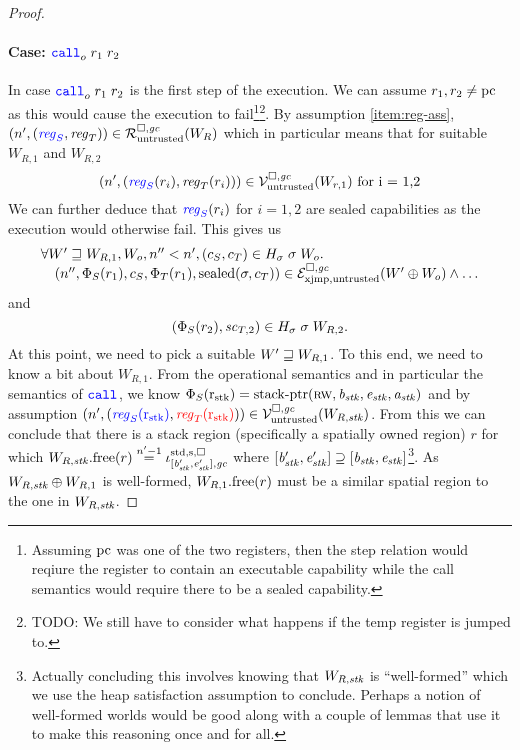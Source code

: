 \documentclass[a4paper]{article}
\begin{document}
\begin{proof}
\paragraph{Case: $\scall[o]{}{r_1}{r_2}$}
In case $\scall[o]{}{r_1}{r_2}$ is the first step of the execution. We can assume $r_1,r_2 \neq \pcreg$ as this would cause the execution to fail\footnote{Assuming $\pcreg$ was one of the two registers, then the step relation would reqiure the register to contain an executable capability while the call semantics would require there to be a sealed capability.}\footnote{{\color{red} TODO:} We still have to consider what happens if the temp register is jumped to.}. By assumption \ref{item:reg-ass}, $\npair[n']{\stpair{\reg}{\reg}} \in \lrr(W_R)$ which in particular means that for suitable $W_{R,1}$ and $W_{R,2}$
\[
  \npair[n']{(\src{\reg_S}(r_i),\reg_T(r_i))} \in \lrv(W_{r,1}) \text{ for i = 1,2}
\]
We can further deduce that $\src{\reg_S}(r_i)$ for $i=1,2$ are sealed capabilities as the execution would otherwise fail. This gives us
\[
  \begin{array}{l}
    \forall W' \future W_{R,1}, W_o, n'' < n', (c_S,c_T) \in H_\sigma \; \sigma \; W_o \ldotp \\
    \quad \npair[n'']{\Phi_S(r_1),c_S,\Phi_T(r_1),\sealed{\sigma,c_T}} \in \lrexj(W' \oplus W_o) \wedge \dots
  \end{array}
\]
and
\[
  (\Phi_S(r_2), \vsc_{T,2}) \in H_\sigma \; \sigma \; W_{R,2}.
\]
At this point, we need to pick a suitable $W' \future W_{R,1}$. To this end, we need to know a bit about $W_{R,1}$. From the operational semantics and in particular the semantics of $\scall{}{}{}{}$, we know $\Phi_S(\rstk) = \stkptr{\rw,\baddr_\stk,\eaddr_\stk,\aaddr_\stk}$ and by assumption $\npair[n']{(\src{\reg_S(\rstk)},\trg{\reg_T(\rstk)})} \in \lrv(W_{R,\stk})$. From this we can conclude that there is a stack region (specifically a spatially owned region) $r$ for which $\pwfree[W_{R,\stk}](r) \nequal[n'-1] \stdreg{[\baddr_\stk',\eaddr_\stk'],\gc}{\spa}$ where $[\baddr_\stk',\eaddr_\stk'] \supseteq [\baddr_\stk,\eaddr_\stk]$\footnote{Actually concluding this involves knowing that $W_{R,\stk}$ is ``well-formed'' which we use the heap satisfaction assumption to conclude. Perhaps a notion of well-formed worlds would be good along with a couple of lemmas that use it to make this reasoning once and for all.}. As $W_{R,\stk} \oplus W_{R,1}$ is well-formed, $\pwfree[W_{R,1}](r)$ must be a similar spatial region to the one in $W_{R,\stk}$.

\end{proof}
\end{document}
